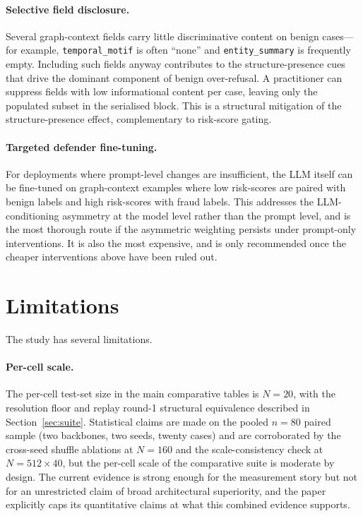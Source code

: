\documentclass[10pt,letterpaper]{article}
\begin{document}
\paragraph{Selective field disclosure.}
Several graph-context fields carry little discriminative content on benign cases---for example, \texttt{temporal\_motif} is often ``none'' and \texttt{entity\_summary} is frequently empty. Including such fields anyway contributes to the structure-presence cues that drive the dominant component of benign over-refusal. A practitioner can suppress fields with low informational content per case, leaving only the populated subset in the serialised block. This is a structural mitigation of the structure-presence effect, complementary to risk-score gating.

\paragraph{Targeted defender fine-tuning.}
For deployments where prompt-level changes are insufficient, the LLM itself can be fine-tuned on graph-context examples where low risk-scores are paired with benign labels and high risk-scores with fraud labels. This addresses the LLM-conditioning asymmetry at the model level rather than the prompt level, and is the most thorough route if the asymmetric weighting persists under prompt-only interventions. It is also the most expensive, and is only recommended once the cheaper interventions above have been ruled out.

\section{Limitations}
\label{sec:limitations}
The study has several limitations.

\paragraph{Per-cell scale.}
The per-cell test-set size in the main comparative tables is $N=20$, with the resolution floor and replay round-1 structural equivalence described in Section~\ref{sec:suite}. Statistical claims are made on the pooled $n=80$ paired sample (two backbones, two seeds, twenty cases) and are corroborated by the cross-seed shuffle ablations at $N=160$ and the scale-consistency check at $N=512\times40$, but the per-cell scale of the comparative suite is moderate by design. The current evidence is strong enough for the measurement story but not for an unrestricted claim of broad architectural superiority, and the paper explicitly caps its quantitative claims at what this combined evidence supports.
\end{document}

